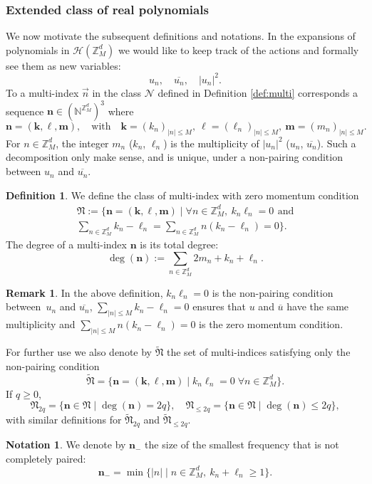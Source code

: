 \documentclass[JEP,XML,SOM,Unicode,published]{cedram}
\let\ts\textstyle
\theoremstyle{plain}
\theoremstyle{definition}
\newtheorem{definition}[theorem]{Definition}
\newtheorem{notation}[theorem]{Notation}
\newtheorem{remark}[theorem]{Remark}
\newcommand{\nb}{{\boldsymbol n}}
\newcommand{\kb}{{\boldsymbol k}}
\newcommand{\lb}{{\boldsymbol \ell}}
\newcommand{\mb}{{\boldsymbol m}}
\newcommand{\Nb}{{\boldsymbol{\mathfrak{N}}}}
\newcommand{\N}{\mathbb{N}}
\newcommand{\Z}{\mathbb{Z}}
\newcommand{\1}{\mathbf{1}}
\begin{document}
\subsubsection{Extended class of real polynomials}
We now motivate the subsequent definitions and notations. In the expansions of polynomials in $\mathcal{H}(\Z_{M}^{d})$ we would like to keep track of the actions and formally see them as new variables:\vspace*{-3pt}
\[
u_{n},\quad \overline{u_{n}},\quad |u_{n}|^{2}.
\]
To a multi-index $\vec{n}$ in the class $\mathcal{N}$ defined in Definition \ref{def:multi} corresponds a sequence $\nb\in(\N^{\Z_{M}^{d}})^{3}$ where
\[
\nb = (\kb, \lb,\mb),\quad \text{with}\quad \kb = (k_{n})_{|n|\leq M},\ \lb = (\ell_{n})_{|n|\leq M},\ \mb = (m_{n})_{|n|\leq M}.
\]
For $n\in\Z_{M}^{d}$, the integer $m_{n}$ (\resp $k_{n}$, $\ell_{n}$) is the multiplicity of $|u_{n}|^{2}$ (\resp $u_{n}$, $\overline{u_{n}}$). Such a decomposition only make sense, and is unique, under a non-pairing condition between $u_{n}$ and $\overline{u_{n}}$.

\begin{definition}
\label{def:multi-bis}
We define the class of multi-index with zero momentum condition
\begin{multline}
\label{eq:monomial}
\Nb := \bigl\{\nb=(\kb,\lb,\mb) \mid \forall n\in\Z_{M}^{d},\ k_n\ell_n=0\,\ \text{and}\\\ts \sum_{n\in\Z_{M}^{d}}k_{n}-\ell_{n}
=\sum_{n\in\Z_{M}^{d}}n(k_{n}-\ell_{n})=0\bigr\}.
\end{multline}
The degree of a multi-index $\nb$ is its total degree:
\[
\deg(\nb) := \sum_{n\in\Z_{M}^{d}}2m_{n}+ k_{n} + \ell_{n}.
\]
\end{definition}
\begin{remark}
In the above definition, $k_{n}\ell_{n}=0$ is the non-pairing condition between~$u_{n}$ and $\overline{u_{n}}$, $\sum_{|n|\leq M}k_{n}-\ell_{n}=0$ ensures that $u$ and $\overline{u}$ have the same multiplicity and $\sum_{|n|\leq M}n(k_{n}-\ell_{n}) = 0$ is the zero momentum condition.
\end{remark}

For further use we also denote by $\widetilde{\Nb}$ the set of multi-indices satisfying only the non-pairing condition
\begin{equation}
\label{eq:N2q-t}
\widetilde{\mathcal{\Nb}} = \{\nb=(\kb,\lb,\mb)\mid k_n\ell_n=0\; \forall n\in\Z_{M}^{d}\}.
\end{equation}
If $q\geq0$,
\begin{equation}
\label{eq:N2q}
{\Nb}_{2q} = \{ \nb\in{\Nb}\mid \deg(\nb)= 2q\},\quad {\Nb}_{\leq 2q} = \{ \nb\in{\Nb}\mid \deg(\nb) \leq 2q\},
\end{equation}
with similar definitions for $\widetilde{\Nb}_{2q}$ and $\widetilde{\Nb}_{\leq 2q}$.
\begin{notation}
We denote by $\nb_{-}$ the size of the smallest frequency that is not completely paired:
\begin{equation}
\label{eq:n-}
\nb_{-}=\min\{|n|\mid n\in\Z_{M}^{d},\ k_{n}+\ell_{n}\geq1\}.
\end{equation}
\end{notation}
\end{document}
